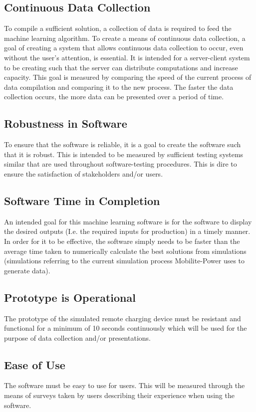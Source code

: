 \documentclass[12pt,a4]{report}
\begin{document}
\subsection*{Continuous Data Collection}
To compile a sufficient solution, a collection of data is required to feed the machine learning algorithm. To create a means of continuous data collection, a goal of creating a system that allows continuous data collection to occur, even without the user's attention, is essential. It is intended for a server-client system to be creating such that the server can distribute computations and increase capacity. This goal is measured by comparing the speed of the current process of data compilation and comparing it to the new process. The faster the data collection occurs, the more data can be presented over a period of time.

\subsection*{Robustness in Software}
To ensure that the software is reliable, it is a goal to create the software such that it is robust. This is intended to be measured by sufficient testing systems similar that are used throughout software-testing procedures. This is dire to ensure the satisfaction of stakeholders and/or users. 

\subsection*{Software Time in Completion}
An intended goal for this machine learning software is for the software to display the desired outputs (I.e. the required inputs for production) in a timely manner. In order for it to be effective, the software simply needs to be faster than the average time taken to numerically calculate the best solutions from simulations (simulations referring to the current simulation process Mobilite-Power uses to generate data).

\subsection*{Prototype is Operational}
The prototype of the simulated remote charging device must be resistant and functional for a minimum of 10 seconds continuously which will be used for the purpose of data collection and/or presentations.

\subsection*{Ease of Use}
The software must be easy to use for users. This will be measured through the means of surveys taken by users describing their experience when using the software.
\end{document}
